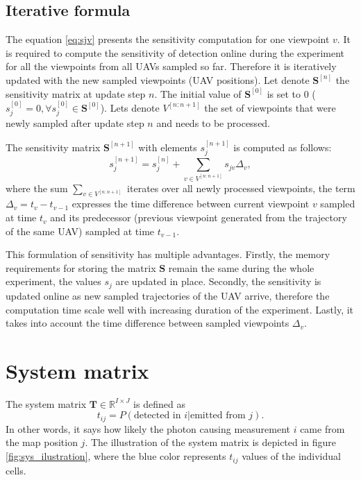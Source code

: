 \subsection{Iterative formula}
The equation \ref{eq:sjv} presents the sensitivity computation for one viewpoint $v$. 
It is required to compute the sensitivity of detection online during the experiment for all the viewpoints from all \ac{UAV}s sampled so far. 
Therefore it is iteratively updated with the new sampled viewpoints (\ac{UAV} positions).
Let denote $\mathbf{S}^{[n]}$ the sensitivity matrix at update step $n$.
The initial value of $\mathbf{S}^{[0]}$ is set to $0$ ($s_{j}^{[0]} = 0 ,\forall s_{j}^{[0]} \in \mathbf{S}^{[0]}$).
Lets denote $V^{[n:n+1]}$ the set of viewpoints that were newly sampled after update step $n$ and needs to be processed. 

The sensitivity matrix $\mathbf{S}^{[n+1]}$ with elements $s_{j}^{[n+1]}$ is computed as follows:
\begin{equation}
  s_{j}^{[n+1]} = s_{j}^{[n]} + \sum_{v \in V^{[n:n+1]}} s_{jv} \Delta_{v}, 
  \label{eq:sen_iter}
\end{equation}
where the sum $\sum_{v \in V^{[n:n+1]}}$ iterates over all newly processed viewpoints, 
the term $\Delta_{v} = t_{v} - t_{v-1}$ expresses the time difference between current viewpoint $v$ sampled at time $t_{v}$ and its predecessor (previous viewpoint generated from the trajectory of the same \ac{UAV}) sampled at time $t_{v-1}$. 

This formulation of sensitivity has multiple advantages.
Firstly, the memory requirements for storing the matrix $\mathbf{S}$ remain the same during the whole experiment, the values $s_{j}$ are updated in place.
Secondly, the sensitivity is updated online as new sampled trajectories of the \ac{UAV} arrive, therefore the computation time scale well with increasing duration of the experiment.
Lastly, it takes into account the time difference between sampled viewpoints $\Delta_{v}$.%

\section{System matrix}
\label{sec:system}
The system matrix $\mathbf{T} \in \mathbb{R}^{I \times J}$ is defined as
\begin{equation}
t_{ij} =  P(\textrm{detected in } i | \textrm{emitted from } j).
\end{equation}
In other words, it says how likely the photon causing measurement $i$ came from the map position $j$.
The illustration of the system matrix is depicted in figure \ref{fig:sys_ilustration}, where the blue color represents $t_{ij}$ values of the individual cells. 

